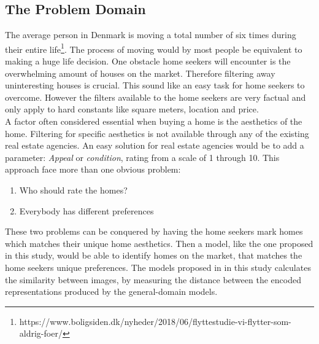 \subsection{The Problem Domain}
The average person in Denmark is moving a total number of six times during their entire life\footnote{https://www.boligsiden.dk/nyheder/2018/06/flyttestudie-vi-flytter-som-aldrig-foer/}. The process of moving  would by most people be equivalent to making a huge life decision. One obstacle home seekers will encounter is the overwhelming amount of houses on the market. Therefore filtering away uninteresting houses is crucial. This sound like an easy task for home seekers to overcome. However the filters available to the home seekers are very factual and only apply to hard constants like square meters, location and price.
\vspace{3mm}\\
A factor often considered essential when buying a home is the aesthetics of the home. Filtering for specific aesthetics is not available through any of the existing real estate agencies.
An easy solution for real estate agencies would be to add a parameter: \textit{Appeal} or \textit{condition}, rating from a scale of 1 through 10. This approach face more than one obvious problem:
\begin{enumerate}
  \item{Who should rate the homes?}
  \item{Everybody has different preferences}
\end{enumerate}
These two problems can be conquered by having the home seekers mark homes which matches their unique home aesthetics. Then a model, like the one proposed in this study, would be able to identify homes on the market, that matches the home seekers unique preferences. The models proposed in in this study calculates the similarity between images, by measuring the distance between the encoded representations produced by the general-domain models.

